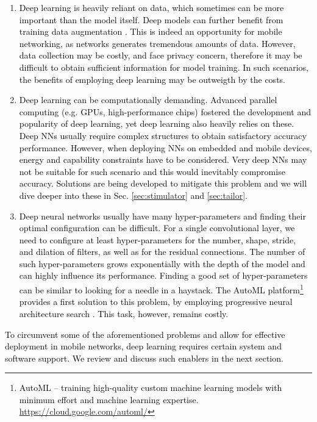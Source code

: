 \documentclass[journal,comsoc,letter]{IEEEtran}
\newcommand{\rev}[1]{\textcolor{black}{#1}}
\begin{document}
\begin{enumerate}
    \item \rev{Deep learning is heavily reliant on data, which sometimes can be more important  than the model itself. Deep models can further benefit from training data augmentation \cite{perez2017effectiveness}. This is indeed an opportunity for mobile networking, as networks generates tremendous amounts of data. However, data collection may be costly, and face privacy concern, therefore it may be difficult to obtain sufficient information for model training. In such scenarios, the benefits of employing deep learning may be outweigth by the costs.}
    \item \rev{Deep learning can be computationally demanding. Advanced parallel computing (e.g. GPUs, high-performance chips) fostered the development and popularity of deep learning, yet deep learning also heavily relies on these. Deep NNs usually require complex structures to obtain satisfactory accuracy performance. However, when deploying NNs on embedded and mobile devices, energy and capability constraints have to be considered. Very deep NNs may not be suitable for such scenario and this would inevitably compromise accuracy. Solutions are being developed to mitigate this problem and we will dive deeper into these in Sec. \ref{sec:stimulator} and \ref{sec:tailor}.}
    \item \rev{Deep neural networks usually have many hyper-parameters and finding their optimal configuration can be difficult. For a single convolutional layer, we need to configure at least hyper-parameters for the number, shape, stride, and dilation of filters, as well as for the residual connections. The number of such hyper-parameters grows exponentially with the depth of the model and can highly influence its performance. Finding a good set of hyper-parameters can be similar to looking for a needle in a haystack. The AutoML platform\footnote{\rev{AutoML -- training high-quality custom machine learning models with minimum effort and machine learning expertise. \url{https://cloud.google.com/automl/}}} provides a first solution to this problem, by employing progressive neural architecture search \cite{liu2017progressive}. This task, however, remains costly.}
\end{enumerate}


\rev{To circumvent some of the aforementioned problems and allow for effective deployment in mobile networks, deep learning requires certain system and software support. We review and discuss such enablers in the next section.}
\end{document}
